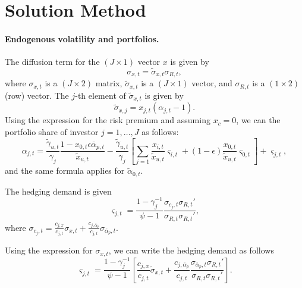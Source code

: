 \documentclass[12pt,english]{article}
\begin{document}
\section{Solution Method}

\paragraph{Endogenous volatility and portfolios.} The diffusion term for the $(J\times1)$ vector $x$ is given by
\begin{equation}\label{eq:sigmax}
	\sigma_{x,t} = \widetilde{\sigma}_{x,t} \sigma_{R,t},
\end{equation}
where $\sigma_{x,t}$ is a $(J\times 2)$ matrix, $\widetilde{\sigma}_{x,t}$ is a $(J\times 1)$ vector, and $\sigma_{R,t}$ is a $(1\times 2)$ (row) vector. The $j$-th element of $\widetilde{\sigma}_{x,t}$ is given by 
\begin{equation}
	\widetilde{\sigma}_{x,j}=x_{j,t}(\alpha_{j,t}-1).
\end{equation}
Using the expression for the risk premium and assuming $ x_c=0 $, we can the portfolio share of investor $j =1,\ldots, J$ as follows:
\begin{equation}
	\alpha_{j,t} = \frac{\tilde{\gamma}_{u,t}}{\gamma_j} \frac{1-x_{0,t} \epsilon\overline{\alpha}_{p,t}}{\tilde{x}_{u,t}} - \frac{\tilde{\gamma}_{u,t}}{\gamma_j} \left[\sum_{j=1} \frac{x_{i,t}}{\tilde{x}_{u,t}} \varsigma_{i,t} + (1-\epsilon) \frac{x_{0,t}}{\tilde{x}_{u,t}} \varsigma_{0,t}\right] + \varsigma_{j,t},
\end{equation}
and the same formula applies for $\tilde{\alpha}_{0,t}$. 

The hedging demand is given 
\begin{equation}
	\varsigma_{j,t} = \frac{1-\gamma_j^{-1}}{\psi-1} \frac{\sigma_{c_j,t} \sigma_{R,t}'}{\sigma_{R,t}\sigma_{R,t}'},
\end{equation}
where $\sigma_{c_j,t} = \frac{c_{j,x}}{c_{j,t}} \sigma_{x,t} + \frac{c_{j,\overline{\alpha}_p}}{c_{j,t}} \sigma_{\overline{\alpha}_p,t}$.

Using the expression for $\sigma_{x,t}$, we can write the hedging demand as follows
\begin{equation}
	\varsigma_{j,t} = \frac{1-\gamma_j^{-1}}{\psi-1} \left[\frac{c_{j,x}}{c_{j,t}} \widetilde{\sigma}_{x,t}+\frac{c_{j,\overline{\alpha}_p}}{c_{j,t}} \frac{\sigma_{\overline{\alpha}_p,t} \sigma_{R,t}'}{\sigma_{R,t}\sigma_{R,t}'}\right].
\end{equation}
\end{document}
